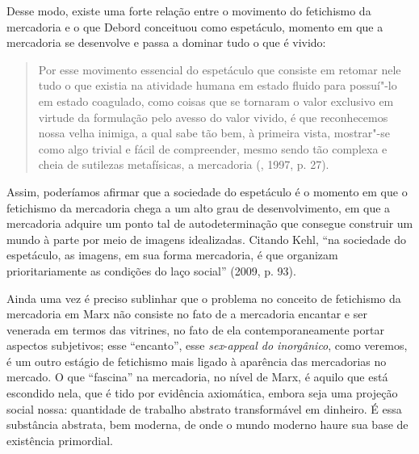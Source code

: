Desse modo, existe uma forte relação entre o movimento do fetichismo da
mercadoria e o que Debord conceituou como espetáculo, momento em que a
mercadoria se desenvolve e passa a dominar tudo o que é vivido:

\begin{quote}
Por esse movimento essencial do espetáculo que consiste em retomar nele
tudo o que existia na atividade humana em estado fluido para possuí"-lo
em estado coagulado, como coisas que se tornaram o valor exclusivo em
virtude da formulação pelo avesso do valor vivido, é que reconhecemos
nossa velha inimiga, a qual sabe tão bem, à primeira vista, mostrar"-se
como algo trivial e fácil de compreender, mesmo sendo tão complexa e
cheia de sutilezas metafísicas, a mercadoria (, 1997, p. 27).
\end{quote}

Assim, poderíamos afirmar que a sociedade do espetáculo é o momento em
que o fetichismo da mercadoria chega a um alto grau de desenvolvimento,
em que a mercadoria adquire um ponto tal de autodeterminação que
consegue construir um mundo à parte por meio de imagens idealizadas.
Citando Kehl, ``na sociedade do espetáculo, as imagens, em sua forma
mercadoria, é que organizam prioritariamente as condições do laço
social'' (2009, p. 93).

Ainda uma vez é preciso sublinhar que o problema no conceito de
fetichismo da mercadoria em Marx não consiste no fato de a mercadoria
encantar e ser venerada em termos das vitrines, no fato de ela
contemporaneamente portar aspectos subjetivos; esse ``encanto'', esse
\emph{sex}-\emph{appeal do inorgânico}, como veremos, é um outro estágio
de fetichismo mais ligado à aparência das mercadorias no mercado. O que
``fascina'' na mercadoria, no nível de Marx, é aquilo que está escondido
nela, que é tido por evidência axiomática, embora seja uma projeção
social nossa: quantidade de trabalho abstrato transformável em dinheiro.
É essa substância abstrata, bem moderna, de onde o mundo moderno haure
sua base de existência primordial.


